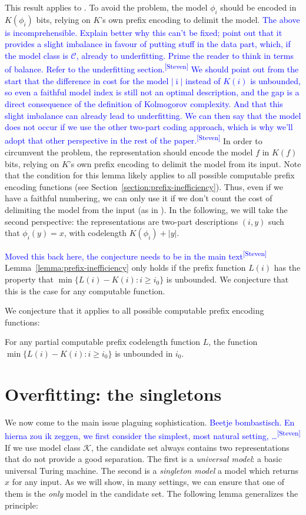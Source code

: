 \documentclass{style/llncs}
\newcommand{\C}{\mathscr C}
\newcommand{\K}{\mathscr K}
\newcommand{\sdr}[1]{\textcolor{blue}{\small #1\textsuperscript{[Steven]} }}
\begin{document}
\noindent This result applies to \cite{adriaans2012facticity}. To avoid the problem, the model $\phi_i$ should be encoded in $K(\phi_i)$ bits, relying on $K$'s own prefix encoding to delimit the model. 
\sdr{The above is incomprehensible. Explain better why this can't be fixed; point out that it provides a slight imbalance in favour of putting stuff in the data part, which, if the model class is $\C$, already to underfitting. Prime the reader to think in terms of balance. Refer to the underfitting section.}
\sdr{We should point out from the start that the difference in cost for the model $|\bar\imath|$ instead of $K(i)$ is unbounded, so even a faithful model index is still not an optimal description, and the gap is a direct consequence of the definition of Kolmogorov complexity. And that this slight imbalance can already lead to underfitting. We can then say that the model does not occur if we use the other two-part coding approach, which is why we'll adopt that other perspective in the rest of the paper.} In order to circumvent the problem, the representation should encode the model $f$ in $K(f)$ bits, relying on $K$'s own prefix encoding to delimit the model from its input.
Note that the condition for this lemma likely applies to all possible computable  prefix encoding functions (see Section~\ref{section:prefix-inefficiency}). Thus, even if we have a faithful numbering, we can only use it if we don't count the cost of delimiting the model from the input (as in \cite{koppelSoph1988}). In the following, we will take the second perspective: the representations are two-part descriptions $(i, y)$ such that $\phi_i(y)=x$, with codelength $K(\phi_i) + |y|$. 

\sdr{Moved this back here, the conjecture needs to be in the main text}
Lemma~\ref{lemma:prefix-inefficiency} only holds if the prefix function $L(i)$ has the property that $\min\{L(i)-K(i):i\ge i_0\}$ is unbounded. We conjecture that this is the case for any computable function.

We conjecture that it applies to all possible computable prefix encoding functions:
\begin{conjecture}
For any partial computable prefix codelength function $L$, the function $\min\{L(i)-K(i):i\ge i_0\}$
is unbounded in $i_0$.
\end{conjecture}


\section{Overfitting: the singletons}
\label{section:overfitting}
We now come to the main issue plaguing sophistication. \sdr{Beetje bombastisch. En hierna zou ik zeggen, we first consider the simplest, most natural setting, \dots} If we use model class $\K$, the candidate set always contains two representations that do not provide a good separation. The first is a \emph{universal model}: a basic universal Turing machine. The second is a \emph{singleton model} a model which returns $x$ for any input. As we will show, in many settings, we can ensure that one of them is the \emph{only} model in the candidate set. The following lemma generalizes the principle:
\end{document}
